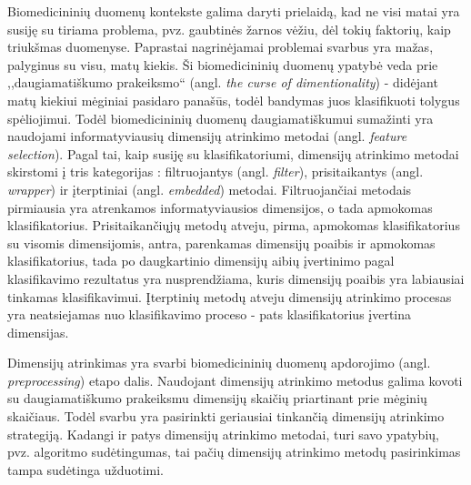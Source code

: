 Biomedicininių duomenų kontekste galima daryti prielaidą, kad ne visi matai yra susiję su tiriama problema, pvz. gaubtinės žarnos vėžiu, dėl tokių faktorių, kaip triukšmas duomenyse. Paprastai nagrinėjamai problemai svarbus yra mažas, palyginus su visu, matų kiekis. Ši biomedicininių duomenų ypatybė veda prie ,,daugiamatiškumo prakeiksmo`` (angl. \textit{the curse of dimentionality}) \cite{bellman1966adaptive} - didėjant matų kiekiui mėginiai pasidaro panašūs, todėl bandymas juos klasifikuoti tolygus spėliojimui. Todėl biomedicininių duomenų daugiamatiškumui sumažinti yra naudojami informatyviausių dimensijų atrinkimo metodai \cite{guyon2003introduction} (angl. \textit{feature selection}). Pagal tai, kaip susiję su klasifikatoriumi, dimensijų atrinkimo metodai skirstomi į tris kategorijas \cite{saeys2008robust}: filtruojantys (angl. \textit{filter}), prisitaikantys (angl. \textit{wrapper}) ir įterptiniai (angl. \textit{embedded}) metodai. Filtruojančiai metodais pirmiausia yra atrenkamos informatyviausios dimensijos, o tada apmokomas klasifikatorius. Prisitaikančiųjų metodų atveju, pirma, apmokomas klasifikatorius su visomis dimensijomis, antra, parenkamas dimensijų poaibis ir apmokomas klasifikatorius, tada po daugkartinio dimensijų aibių įvertinimo pagal klasifikavimo rezultatus yra nusprendžiama, kuris dimensijų poaibis yra labiausiai tinkamas klasifikavimui. Įterptinių metodų atveju dimensijų atrinkimo procesas yra neatsiejamas nuo klasifikavimo proceso - pats klasifikatorius įvertina dimensijas.

Dimensijų atrinkimas yra svarbi biomedicininių duomenų apdorojimo (angl. \textit{preprocessing}) etapo dalis. Naudojant dimensijų atrinkimo metodus galima kovoti su daugiamatiškumo prakeiksmu dimensijų skaičių priartinant prie mėginių skaičiaus. Todėl svarbu yra pasirinkti geriausiai tinkančią dimensijų atrinkimo strategiją. Kadangi ir patys dimensijų atrinkimo metodai, turi savo ypatybių, pvz. algoritmo sudėtingumas, tai pačių dimensijų atrinkimo metodų pasirinkimas tampa sudėtinga užduotimi.

